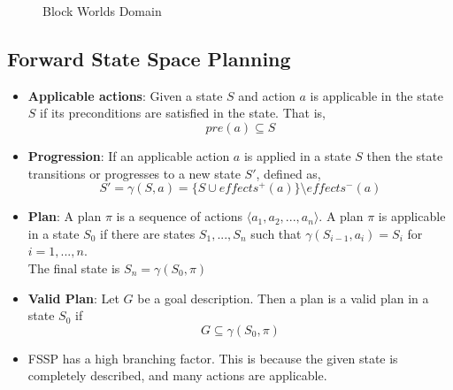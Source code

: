 \documentclass[a4paper]{article}
\begin{document}
\begin{itemize}
\begin{figure}[H]
        \caption{Block Worlds Domain}
    \end{figure}
\end{itemize}
\pagebreak

\subsection{Forward State Space Planning}
\begin{itemize}
    \item \textbf{Applicable actions}: Given a state $S$ and action $a$ is applicable in the state $S$ if its preconditions are satisfied in the state. That is,
    \begin{equation*}
        pre(a)\subseteq S
    \end{equation*}
    \item \textbf{Progression}: If an applicable action $a$ is applied in a state $S$ then the state transitions or progresses to a new state $S'$, defined as,
    \begin{equation*}
        S'=\gamma(S,a)=\{S\cup effects^+(a)\}\text{\textbackslash}effects^-(a)
    \end{equation*}
    \item \textbf{Plan}: A plan $\pi$ is a sequence of actions $\langle a_1,a_2,...,a_n\rangle$. A plan $\pi$ is applicable in a state $S_0$ if there are states $S_1,...,S_n$ such that $\gamma(S_{i-1},a_i)=S_i$ for $i=1,...,n$.\\
    The final state is $S_n=\gamma(S_0,\pi)$
    \item \textbf{Valid Plan}: Let $G$ be a goal description. Then a plan is a valid plan in a state $S_0$ if
    \begin{equation*}
        G\subseteq \gamma(S_0,\pi)
    \end{equation*}
    \item FSSP has a high branching factor. This is because the given state is completely described, and many actions are applicable.
\end{itemize}
\end{document}
